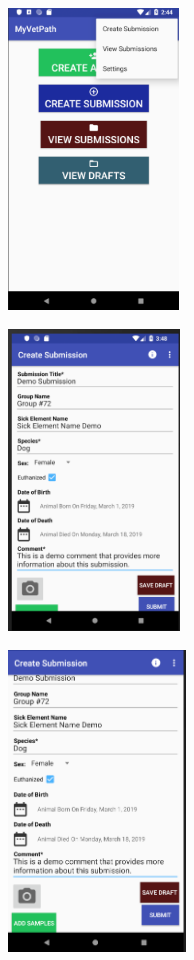 \documentclass[onecolumn, draftclsnofoot,10pt, compsoc]{IEEEtran}
\begin{document}
\begin{center}
\includegraphics[height=8cm]{toolbar.png}
\end{center}

\begin{center}
\includegraphics[height=8cm]{Beta_create_sub_1.png}
\end{center}

\begin{center}
\includegraphics[height=8cm]{Beta_create_sub_2.png}
\end{center}
\end{document}
